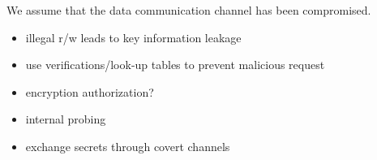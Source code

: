 \documentclass[]{article}
\begin{document}
We assume that the data communication channel has been compromised.
\begin{itemize}
	\item \cite{lim2005extracting} illegal r/w leads to key information leakage
	\item \cite{fiorin2008implementation,sepulveda2012hybrid,kim2009trojan} use verifications/look-up tables to prevent malicious request
	\item \cite{sajeesh2011authenticated} encryption authorization?
	\item \cite{fiorin2009mpsocs} internal probing
	\item \cite{diguet2007noc} exchange secrets through covert channels
\end{itemize}
\end{document}
